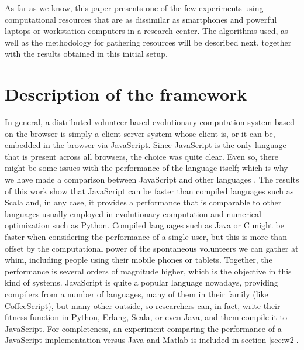 \documentclass[journal,onecolumn]{IEEEtran}
\begin{document}
As far as we know, this paper presents one of the few experiments using %
computational resources that are as dissimilar as smartphones and
powerful laptops 
or workstation computers in a research center. 
The algorithms used, as well as the methodology 
for gathering resources will be described next, 
together with the results obtained in this initial setup.
\section{Description of the framework}
\label{sec:description}

In general, a distributed volunteer-based evolutionary computation
system based on the browser is simply a client-server system
whose client is, or it can be, embedded in the browser via
JavaScript. Since JavaScript is  the only language that is present
across all browsers, the choice was quite clear. Even so, there might
be some issues with the performance of the language itself; which %
 is
why we have made a comparison between JavaScript and other languages
\cite{2015arXiv151101088M}. The results of this work show that JavaScript can be
faster than compiled languages such as Scala and, in any case, it provides
a performance that is comparable to other languages usually employed %
in evolutionary computation and numerical optimization such as Python. 
Compiled languages such as
Java or C might be faster when %
considering the performance of a single-user, 
but this is more than offset by the computational power of
the spontaneous volunteers we can gather at whim, including people
using their mobile phones or tablets. Together, the performance is several orders of magnitude
higher, which is the objective in this kind of systems.
 JavaScript is
quite a popular language nowadays, providing compilers from a number
of languages, many of them in their family (like CoffeeScript), but
many other outside, so researchers can, in fact, write their fitness
function in Python, Erlang, Scala, or even Java, and them compile it to
JavaScript. For completeness, an experiment comparing the performance of
a JavaScript implementation versus Java and Matlab is included in section
\ref{sec:w2}.
\end{document}

